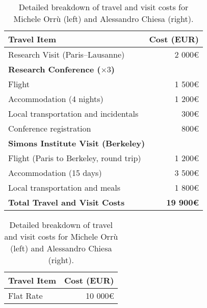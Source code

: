 \documentclass{article}
\begin{document}
\begin{table}[t]
    \centering
    \caption{Detailed breakdown of travel and visit costs for Michele Orrù (left) and Alessandro Chiesa (right).}
    \begin{tabular}[t]{|l|r|}
        \hline
        \textbf{Travel Item} & \textbf{Cost (EUR)} \\
        \hline\hline
        Research Visit (Paris--Lausanne) & 2 000\euro{} \\
        \hline
        \multicolumn{2}{|l|}{\textbf{Research Conference (\(\times 3\))}} \\
        \hline
        Flight & 1 500\euro{} \\
        Accommodation (4 nights) & 1 200\euro{} \\
        Local transportation and incidentals & 300\euro{} \\
        Conference registration & 800\euro{} \\
        \hline
        \multicolumn{2}{|l|}{\textbf{Simons Institute Visit (Berkeley)}} \\
        \hline
        Flight (Paris to Berkeley, round trip) & 1 200\euro{} \\
        Accommodation (15 days) & 3 500\euro{} \\
        Local transportation and meals & 1 800\euro{} \\
        \hline\hline
        \rowcolor{lightgray}
        \textbf{Total Travel and Visit Costs} & \textbf{19 900\euro{}} \\
        \hline
    \end{tabular}
    \begin{tabular}[t]{|l|r|}
        \hline
        \textbf{Travel Item} & \textbf{Cost (EUR)} \\
        \hline\hline
        Flat Rate & 10 000\euro{} \\

\end{tabular}
\end{table}
\end{document}
